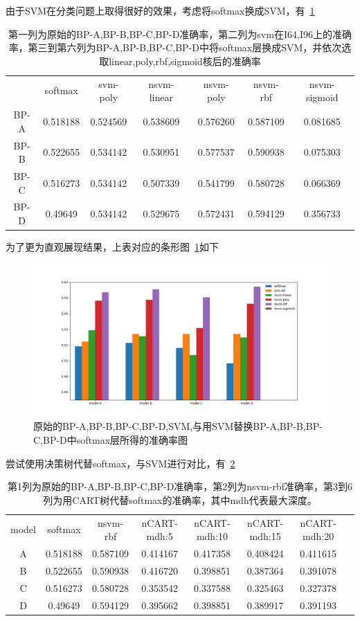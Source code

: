 由于SVM在分类问题上取得很好的效果，考虑将softmax换成SVM，有~\ref{table:bpx3}
\begin{table}[htb]
\centering
\caption{第一列为原始的BP-A,BP-B,BP-C,BP-D准确率，第二列为svm在I64,I96上的准确率，第三到第六列为BP-A,BP-B,BP-C,BP-D中将softmax层换成SVM，并依次选取linear,poly,rbf,sigmoid核后的准确率}
\begin{tabular}{ccccccc}
\toprule[2pt]
\ &softmax &svm-poly &nsvm-linear & nsvm-poly & nsvm-rbf & nsvm-sigmoid \\ 
BP-A & 0.518188 & 0.524569 & 0.538609 & 0.576260 & 0.587109 & 0.081685 \\ 
BP-B & 0.522655 & 0.534142 & 0.530951 & 0.577537 & 0.590938 & 0.075303 \\ 
BP-C & 0.516273 & 0.534142 & 0.507339 & 0.541799 & 0.580728 & 0.066369 \\ 
BP-D & 0.49649 & 0.534142 & 0.529675 & 0.572431 & 0.594129 & 0.356733 \\ 
\bottomrule[2pt]
\end{tabular} 
\label{table:bpx3}
\end{table}

为了更为直观展现结果，上表对应的条形图~\ref{fig:bpx1}如下
\begin{figure}[htb]
\centering
\includegraphics[scale=0.5]{../figures/NN_svm1.png} 
\caption{原始的BP-A,BP-B,BP-C,BP-D,SVM,与用SVM替换BP-A,BP-B,BP-C,BP-D中softmax层所得的准确率图}
\label{fig:bpx1}
\end{figure}

尝试使用决策树代替softmax，与SVM进行对比，有~\ref{table:bpx4}
\begin{table}[htb]
\centering
\caption{第1列为原始的BP-A,BP-B,BP-C,BP-D准确率，第2列为nsvm-rbf准确率，第3到6列为用CART树代替softmax的准确率，其中mdh代表最大深度。}
\begin{tabular}{cccccccc}
\toprule[2pt]
model  & softmax & nsvm-rbf & nCART-mdh:5 & nCART-mdh:10 & nCART-mdh:15 & nCART-mdh:20\\ 
A & 0.518188 & 0.587109 & 0.414167 & 0.417358 & 0.408424 & 0.411615\\ 
B & 0.522655 & 0.590938 & 0.416720 & 0.398851 & 0.387364 & 0.391078\\ 
C & 0.516273 & 0.580728 & 0.353542 & 0.337588 & 0.325463 & 0.327378\\ 
D & 0.49649 & 0.594129 & 0.395662 & 0.398851 & 0.389917 & 0.391193\\ 
\bottomrule[2pt]
\end{tabular} 
\label{table:bpx4}
\end{table}


